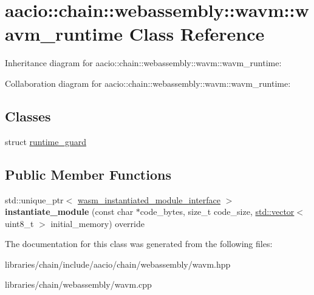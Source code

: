 \hypertarget{classaacio_1_1chain_1_1webassembly_1_1wavm_1_1wavm__runtime}{}\section{aacio\+:\+:chain\+:\+:webassembly\+:\+:wavm\+:\+:wavm\+\_\+runtime Class Reference}
\label{classaacio_1_1chain_1_1webassembly_1_1wavm_1_1wavm__runtime}


Inheritance diagram for aacio\+:\+:chain\+:\+:webassembly\+:\+:wavm\+:\+:wavm\+\_\+runtime\+:


Collaboration diagram for aacio\+:\+:chain\+:\+:webassembly\+:\+:wavm\+:\+:wavm\+\_\+runtime\+:
\subsection*{Classes}
\begin{DoxyCompactItemize}
\item 
struct \mbox{\hyperlink{structaacio_1_1chain_1_1webassembly_1_1wavm_1_1wavm__runtime_1_1runtime__guard}{runtime\+\_\+guard}}
\end{DoxyCompactItemize}
\subsection*{Public Member Functions}
\begin{DoxyCompactItemize}
\item 
\mbox{\label{classaacio_1_1chain_1_1webassembly_1_1wavm_1_1wavm__runtime_a4a9b95f8ec502969699b85bdc20f2d14}} 
std\+::unique\+\_\+ptr$<$ \mbox{\hyperlink{classaacio_1_1chain_1_1wasm__instantiated__module__interface}{wasm\+\_\+instantiated\+\_\+module\+\_\+interface}} $>$ {\bfseries instantiate\+\_\+module} (const char $\ast$code\+\_\+bytes, size\+\_\+t code\+\_\+size, \mbox{\hyperlink{classstd_1_1vector}{std\+::vector}}$<$ uint8\+\_\+t $>$ initial\+\_\+memory) override
\end{DoxyCompactItemize}


The documentation for this class was generated from the following files\+:\begin{DoxyCompactItemize}
\item 
libraries/chain/include/aacio/chain/webassembly/wavm.\+hpp\item 
libraries/chain/webassembly/wavm.\+cpp\end{DoxyCompactItemize}
